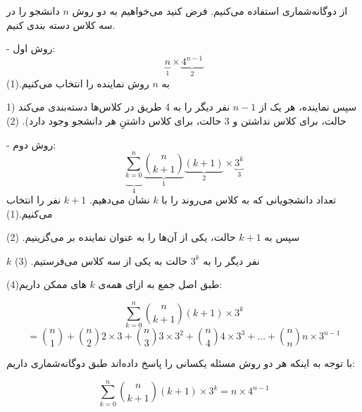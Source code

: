 \p
از دوگانه‌شماری استفاده می‌کنیم.
فرض کنید می‌خواهیم به دو روش  
 $n$
 دانشجو را در سه کلاس دسته بندی کنیم.

\p
 - روش اول:\[\underbrace{n}_{1}\times\underbrace{4^{n-1}}_{2}\] 
 به $n$ 
 روش نماینده را انتخاب می‌کنیم.(1)

  سپس نماینده، هر یک از 
 $n-1$ 
 نفر دیگر را به 4 طریق در کلاس‌ها دسته‌بندی می‌کند 
(1 حالت، برای کلاس نداشتن و 3 حالت، برای کلاس داشتنِ هر دانشجو وجود دارد).
(2)

\p
- روش دوم:\[\underbrace{\sum\limits_{k=0}^{n}}_{4}\underbrace{\binom{n}{k+1}}_{1}\underbrace{(k+1)}_{2}\times\underbrace{3^{k}}_{3}\] 
 تعداد دانشجویانی که به کلاس می‌روند را با 
 $k$ نشان می‌دهیم.  
  $k+1$
  نفر را انتخاب می‌کنیم.(1)
  
   سپس به 
   $k+1$
  حالت، یکی از آن‌ها را به عنوان نماینده بر می‌گزینیم.
  (2)
  
   $k$
   نفر دیگر را به
    $3^{k}$ 
    حالت به یکی از سه کلاس می‌فرستیم.
    (3)
    
     طبق اصل جمع به ازای همه‌ی 
     $k$
     های ممکن داریم(4):    
 
  $$\sum\limits_{k=0}^{n}\binom{n}{k+1}(k+1)\times3^{k}$$
  $$= \binom{n}{1} + \binom{n}{2} 2\times3 + \binom{n}{3} 3\times3^2 +\binom{n}{4} 4\times3^3 +\ldots +\binom{n}{n} n\times3^{n-1}$$ 
 
\p
با توجه به اینکه هر دو روش مسئله یکسانی را پاسخ داده‌اند طبق دوگانه‌شماری داریم:

$$\sum\limits_{k=0}^{n}\binom{n}{k+1}(k+1)\times3^{k} = n\times4^{n-1}$$
